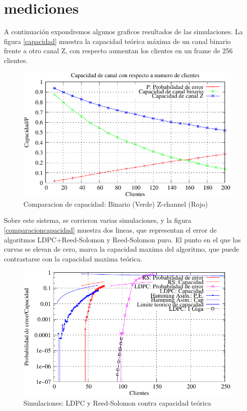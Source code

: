 \documentclass[a4paper,12pt]{article}
\begin{document}
\section{mediciones}

A continuación expondremos algunos graficos resultados de las simulaciones. La figura \ref{capacidad} muestra la capacidad teórica máxima de un canal binario frente a otro canal Z, con respecto aumentan los clientes en un frame de 256 clientes.

\begin{figure}[th]
  \begin{center}
    \includegraphics[scale=1.0]{capacidad1}
  \end{center}
  \caption{Comparacion de capacidad: Binario (Verde) Z-channel (Rojo)}
  \label{fig:capacidad}
\end{figure}

Sobre este sistema, se corrieron varias simulaciones, y la figura  \ref{comparacioncapacidad} muestra dos lineas, que representan el error de algoritmos LDPC+Reed-Solomon y Reed-Solomon puro. El punto en el que las curvas se elevan de cero, marca la capacidad maxima del algoritmo, que puede contrastarse con la capacidad maxima teórica.

\begin{figure}[th]
  \begin{center}
    \includegraphics[scale=1.0]{comparacion_rs_ldpc}
  \end{center}
  \caption{Simulaciones: LDPC y Reed-Solomon contra capacidad teórica}
  \label{fig:comparacioncapacidad}
\end{figure}


\end{document}
